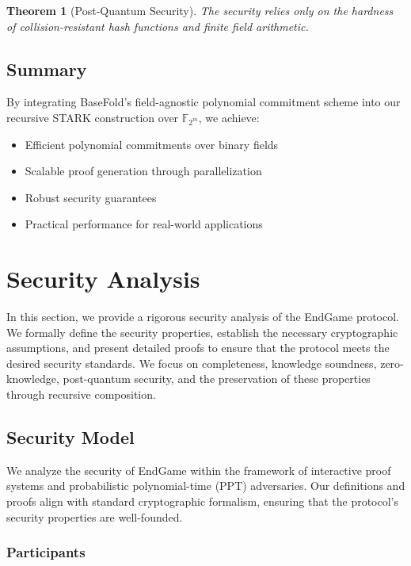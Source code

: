 \documentclass{article}
\theoremstyle{plain}
\newtheorem{theorem}{Theorem}[section]
\theoremstyle{definition}
\theoremstyle{remark}
\theoremstyle{problem}
\begin{document}
\begin{theorem}[Post-Quantum Security]
The security relies only on the hardness of collision-resistant hash functions and finite field arithmetic.
\end{theorem}

\subsection{Summary}

By integrating BaseFold's field-agnostic polynomial commitment scheme into our recursive STARK construction over $\mathbb{F}_{2^m}$, we achieve:

\begin{itemize}
    \item Efficient polynomial commitments over binary fields
    \item Scalable proof generation through parallelization
    \item Robust security guarantees
    \item Practical performance for real-world applications
\end{itemize}

\section{Security Analysis}

In this section, we provide a rigorous security analysis of the EndGame protocol. We formally define the security properties, establish the necessary cryptographic assumptions, and present detailed proofs to ensure that the protocol meets the desired security standards. We focus on completeness, knowledge soundness, zero-knowledge, post-quantum security, and the preservation of these properties through recursive composition.

\subsection{Security Model}

We analyze the security of EndGame within the framework of interactive proof systems and probabilistic polynomial-time (PPT) adversaries. Our definitions and proofs align with standard cryptographic formalism, ensuring that the protocol's security properties are well-founded.

\subsubsection{Participants}
\end{document}
